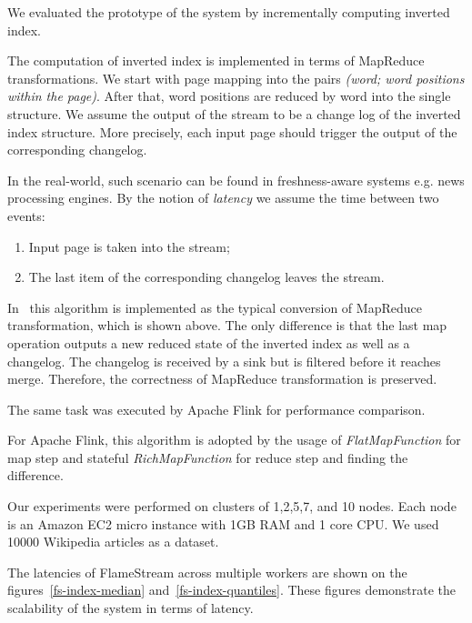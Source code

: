 
\label{fs-experiments-section}

We evaluated the prototype of the system by incrementally computing inverted index.

The computation of inverted index is implemented in terms of MapReduce transformations. We start with page mapping into the pairs {\it (word; word positions within the page)}. After that, word positions are reduced by word into the single structure. We assume the output of the stream to be a change log of the inverted index structure. More precisely, each input page should trigger the output of the corresponding changelog. 

In the real-world, such scenario can be found in freshness-aware systems e.g. news processing engines. By the notion of {\it latency} we assume the time between two events: 
\begin{enumerate}
    \item Input page is taken into the stream;
    \item The last item of the corresponding changelog leaves the stream.
\end{enumerate}

In \FlameStream\ this algorithm is implemented as the typical conversion of MapReduce transformation, which is shown above. The only difference is that the last map operation outputs a new reduced state of the inverted index as well as a changelog. The changelog is received by a sink but is filtered before it reaches merge. Therefore, the correctness of MapReduce transformation is preserved.

The same task was executed by Apache Flink for performance comparison.

For Apache Flink, this algorithm is adopted by the usage of {\it FlatMapFunction} for map step and stateful {\it RichMapFunction} for reduce step and finding the difference.

Our experiments were performed on clusters of 1,2,5,7, and 10 nodes. Each node is an Amazon EC2 micro instance with 1GB RAM and 1 core CPU. We used 10000 Wikipedia articles as a dataset. 

The latencies of FlameStream across multiple workers are shown on the figures~\ref{fs-index-median} and~\ref{fs-index-quantiles}. These figures demonstrate the scalability of the system in terms of latency.


